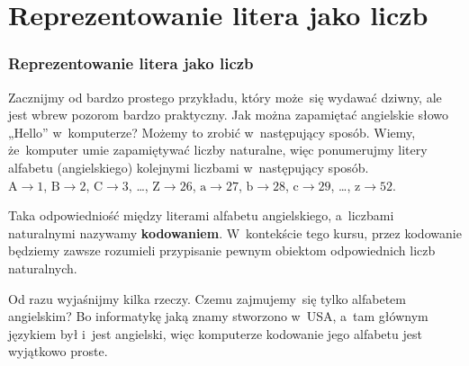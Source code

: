 \documentclass[10pt,t]{beamer}
\begin{document}
\section{Reprezentowanie litera jako liczb}


\begin{frame}
  \frametitle{Reprezentowanie litera jako liczb}


  Zacznijmy od bardzo prostego przykładu, który może~się wydawać
  dziwny, ale jest wbrew pozorom bardzo praktyczny. Jak można zapamiętać
  angielskie słowo „Hello” w~komputerze? Możemy to zrobić w~następujący
  sposób. Wiemy, że~komputer umie zapamiętywać liczby naturalne, więc
  ponumerujmy litery alfabetu (angielskiego) kolejnymi liczbami
  w~następujący sposób. \\
  $\text{A} \to 1$, $\text{B} \to 2$, $\text{C} \to 3$, \ldots, $\text{Z} \to 26$,
  $\text{a} \to 27$, $\text{b} \to 28$, $\text{c} \to 29$, \ldots,
  $\text{z} \to 52$.

  Taka odpowiedniość między literami alfabetu angielskiego, a~liczbami
  naturalnymi nazywamy \textbf{kodowaniem}. W~kontekście tego kursu, przez
  kodowanie będziemy zawsze rozumieli przypisanie pewnym obiektom
  odpowiednich liczb naturalnych.

  Od razu wyjaśnijmy kilka rzeczy. Czemu zajmujemy~się tylko alfabetem
  angielskim? Bo informatykę jaką znamy stworzono w~USA, a~tam głównym
  językiem był i~jest angielski, więc komputerze kodowanie jego alfabetu
  jest wyjątkowo proste.

\end{frame}
\end{document}
